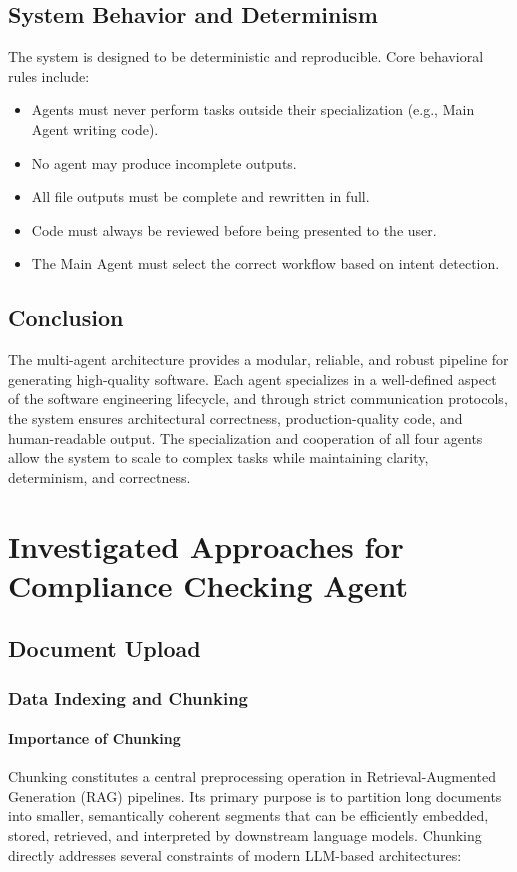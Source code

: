 \documentclass[12pt,a4paper]{article}
\begin{document}
\subsection{System Behavior and Determinism}

The system is designed to be deterministic and reproducible. Core behavioral rules include:

\begin{itemize}
    \item Agents must never perform tasks outside their specialization (e.g., Main Agent writing code).
    \item No agent may produce incomplete outputs.
    \item All file outputs must be complete and rewritten in full.
    \item Code must always be reviewed before being presented to the user.
    \item The Main Agent must select the correct workflow based on intent detection.
\end{itemize}

\subsection{Conclusion}

The multi-agent architecture provides a modular, reliable, and robust pipeline for generating high-quality software. Each agent specializes in a well-defined aspect of the software engineering lifecycle, and through strict communication protocols, the system ensures architectural correctness, production-quality code, and human-readable output. The specialization and cooperation of all four agents allow the system to scale to complex tasks while maintaining clarity, determinism, and correctness.

\section{Investigated Approaches for Compliance Checking Agent}
\subsection{Document Upload}

\subsubsection{Data Indexing and Chunking}

\paragraph{Importance of Chunking}
Chunking constitutes a central preprocessing operation in Retrieval-Augmented Generation (RAG) pipelines. Its primary purpose is to partition long documents into smaller, semantically coherent segments that can be efficiently embedded, stored, retrieved, and interpreted by downstream language models. Chunking directly addresses several constraints of modern LLM-based architectures:
\end{document}
